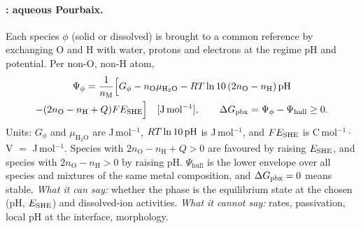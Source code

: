 \paragraph{\Rs: aqueous Pourbaix.} Each species $\phi$ (solid or dissolved) is brought to a
common reference by exchanging O and H with water, protons and electrons at the regime pH and
potential. Per non-O, non-H atom,
\begin{multline}\label{th:eq:pbx}
\Psi_\phi=\frac{1}{n_\mathrm{M}}\Big[G_\phi-n_\mathrm{O}\mu_{\mathrm{H_2O}}-R T\ln10\,(2n_\mathrm{O}-n_\mathrm{H})\,\mathrm{pH}\\
-(2n_\mathrm{O}-n_\mathrm{H}+Q)FE_\mathrm{SHE}\Big] \quad[\mathrm{J\,mol^{-1}}],\qquad \Delta G_\mathrm{pbx}=\Psi_\phi-\Psi_\mathrm{hull}\ge0.
\end{multline}
Units: $G_\phi$ and $\mu_{\mathrm{H_2O}}$ are J\,mol$^{-1}$, $R T\ln10\,\mathrm{pH}$ is J\,mol$^{-1}$,
and $FE_\mathrm{SHE}$ is C\,mol$^{-1}\cdot$V $=$ J\,mol$^{-1}$. Species with $2n_\mathrm{O}-n_\mathrm{H}+Q>0$
are favoured by raising $E_\mathrm{SHE}$, and species with $2n_\mathrm{O}-n_\mathrm{H}>0$ by raising pH.
$\Psi_\mathrm{hull}$ is the lower envelope over all species and mixtures of the same metal
composition, and $\Delta G_\mathrm{pbx}=0$ means stable. \emph{What it can say:} whether the phase is the
equilibrium state at the chosen (pH, $E_\mathrm{SHE}$) and dissolved-ion activities. \emph{What it cannot
say:} rates, passivation, local pH at the interface, morphology.

